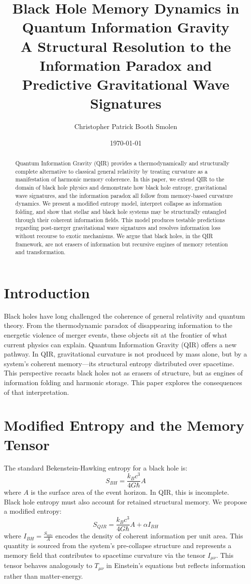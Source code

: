 \documentclass[11pt]{article}
\title{Black Hole Memory Dynamics in Quantum Information Gravity\\
\large A Structural Resolution to the Information Paradox and Predictive Gravitational Wave Signatures}
\author{Christopher Patrick Booth Smolen}
\date{\today}
\begin{document}
\maketitle

\begin{abstract}
Quantum Information Gravity (QIR) provides a thermodynamically and structurally complete alternative to classical general relativity by treating curvature as a manifestation of harmonic memory coherence. In this paper, we extend QIR to the domain of black hole physics and demonstrate how black hole entropy, gravitational wave signatures, and the information paradox all follow from memory-based curvature dynamics. We present a modified entropy model, interpret collapse as information folding, and show that stellar and black hole systems may be structurally entangled through their coherent information fields. This model produces testable predictions regarding post-merger gravitational wave signatures and resolves information loss without recourse to exotic mechanisms. We argue that black holes, in the QIR framework, are not erasers of information but recursive engines of memory retention and transformation.
\end{abstract}

\section{Introduction}

Black holes have long challenged the coherence of general relativity and quantum theory. From the thermodynamic paradox of disappearing information to the energetic violence of merger events, these objects sit at the frontier of what current physics can explain. Quantum Information Gravity (QIR) offers a new pathway. In QIR, gravitational curvature is not produced by mass alone, but by a system's coherent memory—its structural entropy distributed over spacetime. This perspective recasts black holes not as erasers of structure, but as engines of information folding and harmonic storage. This paper explores the consequences of that interpretation.

\section{Modified Entropy and the Memory Tensor}

The standard Bekenstein-Hawking entropy for a black hole is:
\[
S_{BH} = \frac{k_B c^3}{4G \hbar} A
\]
where \( A \) is the surface area of the event horizon. In QIR, this is incomplete. Black hole entropy must also account for retained structural memory. We propose a modified entropy:
\[
S_{QIR} = \frac{k_B c^3}{4G \hbar} A + \alpha I_{BH}
\]
where \( I_{BH} = \frac{S_{\text{info}}}{A} \) encodes the density of coherent information per unit area. This quantity is sourced from the system's pre-collapse structure and represents a memory field that contributes to spacetime curvature via the tensor \( I_{\mu\nu} \). This tensor behaves analogously to \( T_{\mu\nu} \) in Einstein's equations but reflects information rather than matter-energy.
\end{document}
